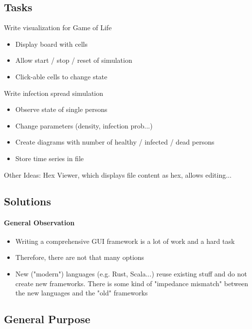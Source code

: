 

\subsection{Tasks}

Write visualization for Game of Life

\begin{itemize}
	\item Display board with cells
	\item Allow start / stop / reset of simulation
	\item Click-able cells to change state
\end{itemize}

Write infection spread simulation

\begin{itemize}
	\item Observe state of single persons
	\item Change parameters (density, infection prob...)
	\item Create diagrams with number of healthy / infected / dead persons
	\item Store time series in file
\end{itemize}

Other Ideas: Hex Viewer, which displays file content as hex, allows editing...

\subsection{Solutions}

\paragraph{General Observation}

\begin{itemize}
	\item Writing a comprehensive GUI framework is a lot of work and a hard task
	\item Therefore, there are not that many options
	\item New ("modern") languages (e.g. Rust, Scala...) reuse existing stuff and do not create new frameworks. There is some kind of "impedance mismatch" between the new languages and the "old" frameworks
\end{itemize}



\subsection{General Purpose}

